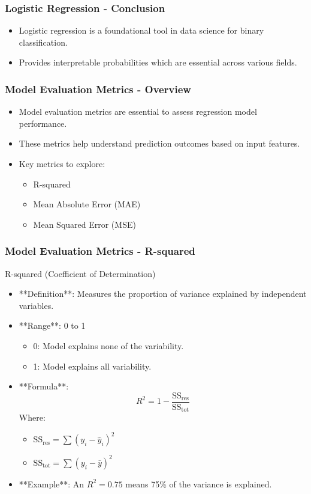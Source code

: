 \documentclass[aspectratio=169]{beamer}
\begin{document}
\begin{frame}[fragile]
    \frametitle{Logistic Regression - Conclusion}
    \begin{itemize}
        \item Logistic regression is a foundational tool in data science for binary classification.
        \item Provides interpretable probabilities which are essential across various fields.
    \end{itemize}
\end{frame}

\begin{frame}[fragile]
  \frametitle{Model Evaluation Metrics - Overview}
  \begin{itemize}
    \item Model evaluation metrics are essential to assess regression model performance.
    \item These metrics help understand prediction outcomes based on input features.
    \item Key metrics to explore:
      \begin{itemize}
        \item R-squared
        \item Mean Absolute Error (MAE)
        \item Mean Squared Error (MSE)
      \end{itemize}
  \end{itemize}
\end{frame}

\begin{frame}[fragile]
  \frametitle{Model Evaluation Metrics - R-squared}
  \begin{block}{R-squared (Coefficient of Determination)}
    \begin{itemize}
      \item **Definition**: Measures the proportion of variance explained by independent variables.
      \item **Range**: 0 to 1
      \begin{itemize}
        \item 0: Model explains none of the variability.
        \item 1: Model explains all variability.
      \end{itemize}
      \item **Formula**: 
      \begin{equation}
        R^2 = 1 - \frac{\text{SS}_{\text{res}}}{\text{SS}_{\text{tot}}}
      \end{equation}
      Where:
      \begin{itemize}
        \item $\text{SS}_{\text{res}} = \sum{(y_i - \hat{y}_i)^2}$
        \item $\text{SS}_{\text{tot}} = \sum{(y_i - \bar{y})^2}$
      \end{itemize}
      \item **Example**: An \(R^2 = 0.75\) means 75\% of the variance is explained.
    \end{itemize}
  \end{block}
\end{frame}
\end{document}
